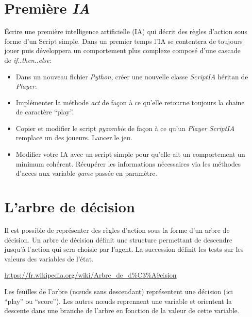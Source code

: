 \documentclass[a4paper, 10pt]{article}
\begin{document}
\section{Première \emph{IA}}
\'Ecrire une première intelligence artificielle (IA) qui décrit des règles d'action sous forme d'un Script simple. Dans un premier temps l'IA se contentera de toujours jouer puis développera un comportement plus complexe composé d'une cascade de \emph{if..then..else}:

\begin{itemize}[$\bigcirc$]
\item Dans un nouveau fichier \emph{Python}, créer une nouvelle classe \emph{ScriptIA} héritan de \emph{Player}.
\item Implémenter la méthode \emph{act} de façon à ce qu'elle retourne toujours la chaine de caractère ``play''.
\item Copier et modifier le script \emph{pyzombie} de façon à ce qu'un \emph{Player} \emph{ScriptIA} remplace un des joueurs.
Lancer le jeu.
\item Modifier votre IA avec un script simple pour qu'elle ait un comportement un minimum cohérent.
Récupérer les informations nécessaires via les méthodes d'acces aux variable \emph{game} passée en paramètre.
\end{itemize}


\section{L'arbre de décision}%

  Il est possible de représenter des règles d'action sous la forme d'un arbre de décision.
Un arbre de décision définit une structure permettant de descendre jusqu'à l'action qui sera choisie par l'agent.
La succession définit les tests sur les valeurs des variables de l'état.

\url{https://fr.wikipedia.org/wiki/Arbre\_de\_d\%C3\%A9cision}

Les feuilles de l'arbre (n\oe{}uds sans descendant) représentent une décision (ici ``play'' ou ``score''). Les autres n\oe{}uds reprennent une variable et orientent la descente dans une branche de l'arbre en fonction de la valeur de cette variable.
\end{document}
